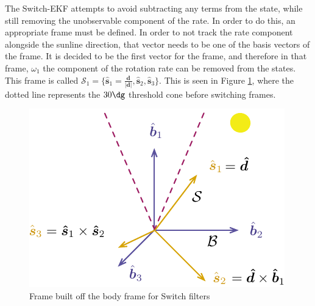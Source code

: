 \documentclass[]{BasiliskReportMemo}
\begin{document}
The Switch-EKF attempts to avoid subtracting any terms from the state, while still removing the unobservable component of the rate. In order to do this, an appropriate frame must be defined.
In order to not track the rate component alongside the sunline direction, that vector needs to be one of the basis vectors of the frame. It is decided to be the first vector for the frame, and therefore in that frame, $\omega_1$ the component of the rotation rate can be removed from the states. 
This frame is called $\mathcal{S}_1 = \{\hat{\bm s}_1 = \frac{\bm d}{|\bm d|}, \hat{\bm s}_2, \hat{\bm s}_3 \}$. This is seen in Figure \ref{fig:Switches}, where the dotted line represents the $30 \dg$ threshold cone before switching frames. 

\begin{figure}[t]
	\centering
	\includegraphics[]{./Figures/Switches}
	\caption{Frame built off the body frame for Switch filters}
	\label{fig:Switches}
\end{figure}
\end{document}
